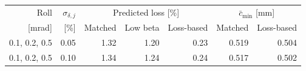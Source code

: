 \begin{tabular}{rrrrrrr}\toprule
Roll & $\sigma_{\delta,j}$ & \multicolumn{3}{c}{Predicted loss [\%]} & \multicolumn{2}{c}{$\bar c_{\min}$ [mm]}\\
{}[mrad] & [\%] & Matched & Low beta & Loss-based & Matched & Loss-based \\\midrule
0.1, 0.2, 0.5 & 0.05 & 1.32 & 1.20 & 0.23 & 0.519 & 0.504 \\
0.1, 0.2, 0.5 & 0.10 & 1.34 & 1.24 & 0.24 & 0.517 & 0.502 \\
\bottomrule\end{tabular}

